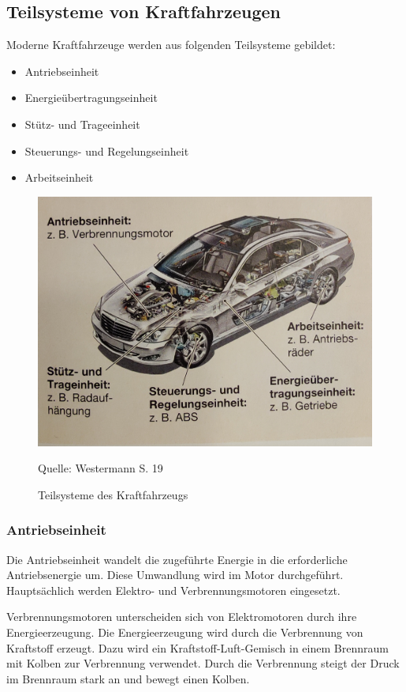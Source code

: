 \subsection{Teilsysteme von Kraftfahrzeugen}
Moderne Kraftfahrzeuge werden aus folgenden Teilsysteme gebildet:
\begin{itemize}
	\item Antriebseinheit
	\item Energieübertragungseinheit
	\item Stütz- und Trageeinheit
	\item Steuerungs- und Regelungseinheit
	\item Arbeitseinheit
\end{itemize}


\begin{figure}[!ht]
	\caption{Teilsysteme des Kraftfahrzeugs}
	\includegraphics[scale=0.1]{assets/figures/Teilsysteme des Kraftfahrzeugs.jpg}
	\begin{flushleft}
		Quelle: Westermann S. 19
	\end{flushleft}
	\label{fig:birds}
\end{figure}


\subsubsection{Antriebseinheit}
Die Antriebseinheit wandelt die zugeführte Energie in die erforderliche Antriebsenergie um.
Diese Umwandlung wird im Motor durchgeführt.
Hauptsächlich werden Elektro- und Verbrennungsmotoren eingesetzt.

Verbrennungsmotoren unterscheiden sich von Elektromotoren durch ihre Energieerzeugung.
Die Energieerzeugung wird durch die Verbrennung von Kraftstoff erzeugt.
Dazu wird ein Kraftstoff-Luft-Gemisch in einem Brennraum mit Kolben zur Verbrennung verwendet.
Durch die Verbrennung steigt der Druck im Brennraum stark an und bewegt einen Kolben.


